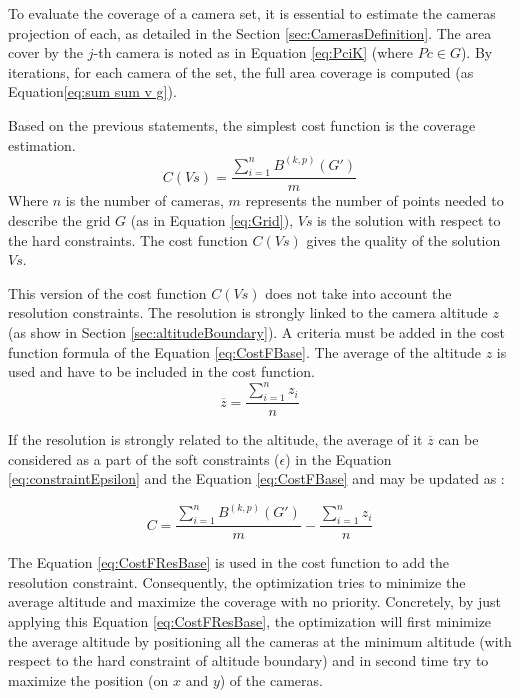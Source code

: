 To evaluate the coverage of a camera set, it is essential to estimate the cameras projection of each, as detailed in the Section \ref{sec:CamerasDefinition}. The area cover by the $j$-th camera is noted as in Equation \ref{eq:PciK} (where $Pc\in G$). By iterations, for each camera of the set, the full area coverage is computed (as Equation\ref{eq:sum sum v g}). 

Based on the previous statements, the simplest cost function is the coverage estimation.
\begin{equation}\label{eq:CostFBase}
C(Vs) =  \frac{\sum_{i=1}^n{B^{(k,p)}(G')} }{m}   
\end{equation}
Where $n$ is the number of cameras,
$m$ represents the number of points needed to describe the grid $G$ (as in Equation \ref{eq:Grid}), $Vs$ is the solution with respect to the hard constraints.
The cost function $C(Vs)$ gives the quality of the solution $Vs$.

This version of the cost function $C(Vs)$ does not take into account the resolution constraints. The resolution is  strongly linked to the camera altitude $z$ (as show in Section \ref{sec:altitudeBoundary}).
 A criteria must be added in the cost function formula of the Equation \ref{eq:CostFBase}. The average of the altitude $z$ is used and have to be included in the cost function.
 \begin{equation}\label{eq:CostFResolutionPart1}
\overline{z}= \frac{\sum_{i=1}^n z_i}{n}     
\end{equation}

 If the resolution is strongly related to the altitude, the average of it $\overline{z}$ can be considered as a part of the soft constraints ($\epsilon$)  in the Equation \ref{eq:constraintEpsilon} and the Equation \ref{eq:CostFBase} and may be updated as : 
 
 \begin{equation}\label{eq:CostFResBase}
C =  \frac{\sum_{i=1}^n {B^{(k,p)}(G')}}{m}  - \frac{\sum_{i=1}^n z_i}{n}     
\end{equation}
 
The Equation \ref{eq:CostFResBase} is used in the cost function to add the resolution constraint. Consequently, the optimization  tries to minimize the average altitude and maximize the coverage with no priority. Concretely, by just applying this Equation  \ref{eq:CostFResBase}, the optimization will first minimize the average altitude by positioning all the cameras at the minimum altitude (with respect to the hard constraint of altitude boundary) and in second time try to maximize the position (on $x$ and $y$) of the cameras. 

